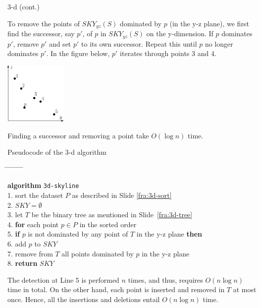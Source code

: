 \documentclass{beamer}
\def\tabpos{\hspace{4mm} \= \hspace{4mm} \= \hspace{4mm} \= \hspace{4mm} \= \hspace{4mm} \= \hspace{4mm} \= \hspace{4mm} \= \hspace{4mm} \= \hspace{4mm} \kill}
\begin{document}
\begin{frame}{3-d (cont.)}
\begin{small}
    To remove the points of $SKY_{yz}(S)$ dominated by $p$ (in the y-z plane), we first find the successor, say $p'$, of $p$ in $SKY_{yz}(S)$ on the y-dimension. If $p$ dominates $p'$, remove $p'$ and set $p'$ to its own successor. Repeat this until $p$ no longer dominates $p'$. In the figure below, $p'$ iterates through points 3 and 4.
    \begin{center}
        \includegraphics[height=30mm]{./artwork/3d.eps}
    \end{center}
    Finding a successor and removing a point take $O(\log n)$ time.
\end{small}
\end{frame}
\begin{frame}{Pseudocode of the 3-d algorithm}
\begin{small}
    \begin{tabbing}
        \tabpos

        {\bf algorithm} \texttt{3d-skyline} \\
        1.\>    sort the dataset $P$ as described in Slide \ref{fra:3d-sort} \\
        2.\>    $SKY = \emptyset$ \\
        3.\>    let $T$ be the binary tree as mentioned in Slide~\ref{fra:3d-tree} \\
        4.\>    {\bf for} each point $p \in P$ in the sorted order \\
        5.\>\>      {\bf if} $p$ is not dominated by any point of $T$ in the y-z plane {\bf then} \\
        6.\>\>\>        add $p$ to $SKY$ \\
        7.\>\>\>        remove from $T$ all points dominated by $p$ in the y-z plane \\
        8.\>    {\bf return} $SKY$
    \end{tabbing}

    The detection at Line 5 is performed $n$ times, and thus, requires $O(n \log n)$ time in total. On the other hand, each point is inserted and removed in $T$ at most once. Hence, all the insertions and deletions entail $O(n \log n)$ time.
\end{small}
\end{frame}
\end{document}
